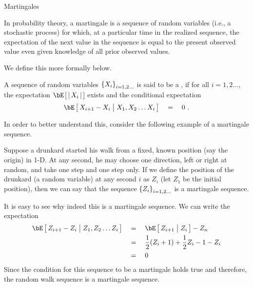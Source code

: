\documentclass[11pt,a4paper]{article}
\begin{document}
\begin{ssection}{Martingales}
	
	In probability theory, a martingale is a sequence of random variables (i.e., a stochastic process) for which, at a particular time in the realized sequence, the expectation of the next value in the sequence is equal to the present observed value even given knowledge of all prior observed values. \cite{martingale-wiki}
	
	We define this more formally below. \br
	
	\begin{definition}[Martingale]
		A sequence of random variables $\left\{ {X_i} \right\}_{i = 1, 2 \dots}$ is said to be a , if for all $i = 1, 2 \dots$, the expectation $\E{\abs{X_i}}$ exists and the conditional expectation
		\begin{align*}
			\E{X_{i + 1} - X_i \pipe X_1, X_2 \dots X_i}	\eq	0 \ . 
		\end{align*}
		\label{def:martingale}
	\end{definition}
	
	In order to better understand this, consider the following example of a martingale sequence. \br
	
	\begin{example}
		Suppose a drunkard started his walk from a fixed, known position (say the origin) in 1-D. At any second, he may choose one direction, \ie left or right at random, and take one step and one step only. If we define the position of the drunkard (a random variable) at any second $i$ as $Z_i$ (let $Z_1$ be the initial position), then we can say that the sequence $\left\{ {Z_i} \right\}_{i = 1, 2 \dots}$ is a martingale sequence.
		
		It is easy to see why indeed this is a martingale sequence. We can write the expectation
		\begin{align*}
			\E{Z_{i + 1} - Z_i \pipe Z_1, Z_2 \dots Z_i} & \eq	\E{Z_{i + 1} \pipe Z_i} - Z_n                      \\
			                                             & \eq	\frac{1}{2} (Z_i + 1) + \frac{1}{2}{Z_i - 1} - Z_i \\
			                                             & \eq	0                                                  
		\end{align*}
		Since the condition for this sequence to be a martingale holds true and therefore, the random walk sequence is a martingale sequence.
	\end{example} \br
	

\end{ssection}
\end{document}
